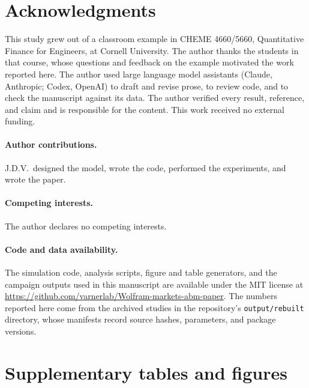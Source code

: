 \documentclass{article}
\theoremstyle{definition}
\theoremstyle{remark}
\begin{document}




\section*{Acknowledgments}
This study grew out of a classroom example in CHEME 4660/5660,
Quantitative Finance for Engineers, at Cornell University. The author
thanks the students in that course, whose questions and feedback on the
example motivated the work reported here. The author used large
language model assistants (Claude, Anthropic; Codex,
OpenAI) to draft and revise prose, to review code, and to check the
manuscript against its data. The author verified every result,
reference, and claim and is responsible for the content. This work
received no external funding.

\paragraph{Author contributions.}
J.D.V.\ designed the model, wrote the code, performed the experiments,
and wrote the paper.

\paragraph{Competing interests.}
The author declares no competing interests.

\paragraph{Code and data availability.}
The simulation code, analysis scripts, figure and table generators, and
the campaign outputs used in this manuscript are available under the MIT
license at \url{https://github.com/varnerlab/Wolfram-markets-abm-paper}.
The numbers reported here come from the archived studies in the
repository's \texttt{output/rebuilt} directory, whose manifests record
source hashes, parameters, and package versions.

\clearpage



\clearpage


\clearpage
\appendix



\clearpage
\section{Supplementary tables and figures}
\label{app:tables}







\end{document}

